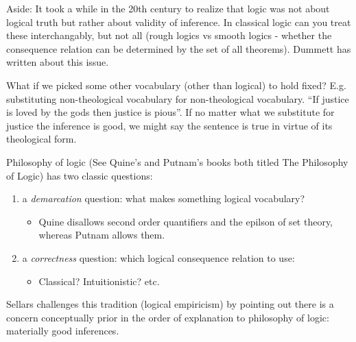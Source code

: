 
Aside: It took a while in the 20th century to realize that logic was not about
logical truth but rather about validity of inference. In classical logic can
you treat these interchangably, but not all (rough logics vs smooth logics -
whether the consequence relation can be determined by the set of all theorems).
Dummett has written about this issue.

What if we picked some other vocabulary (other than logical) to hold fixed? E.g.
substituting non-theological vocabulary for non-theological vocabulary.
``If justice is loved by the gods then justice is pious''. If no matter what we
substitute for justice the inference is good, we might say the sentence is true
in virtue of its theological form.

Philosophy of logic (See Quine's and Putnam's books both titled The Philosophy
of Logic) has two classic questions:
\begin{enumerate}
    \item a \emph{demarcation} question: what makes something logical vocabulary?
     \begin{itemize}
        \item Quine disallows second order quantifiers and the epilson of set
              theory, whereas Putnam allows them.
     \end{itemize}
    \item a \emph{correctness} question: which logical consequence relation to use:
      \begin{itemize}
      \item Classical? Intuitionistic? etc.
      \end{itemize}
\end{enumerate}

Sellars challenges this tradition (logical empiricism) by pointing out there is
a concern conceptually prior in the order of explanation to philosophy of
logic: materially good inferences.
